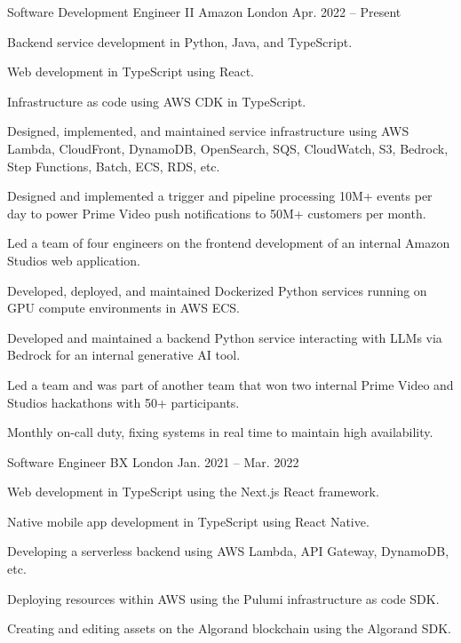 \vspace{-1.1em}


\vspace{-0.2em}

\begin{cventries}

  \cventry
    {Software Development Engineer II} %
    {Amazon} %
    {London} %
    {Apr. 2022 -- Present} %
    {
      \begin{cvitems} %
        \item {Backend service development in Python, Java, and TypeScript.}
        \item {Web development in TypeScript using React.}
        \item {Infrastructure as code using AWS CDK in TypeScript.}
        \item {Designed, implemented, and maintained service infrastructure using AWS Lambda, CloudFront, DynamoDB, OpenSearch, SQS, CloudWatch, S3, Bedrock, Step Functions, Batch, ECS, RDS, etc.}
        \item {Designed and implemented a trigger and pipeline processing 10M+ events per day to power Prime Video push notifications to 50M+ customers per month.}
        \item {Led a team of four engineers on the frontend development of an internal Amazon Studios web application.}
        \item {Developed, deployed, and maintained Dockerized Python services running on GPU compute environments in AWS ECS.}
        \item {Developed and maintained a backend Python service interacting with LLMs via Bedrock for an internal generative AI tool.}
        \item {Led a team and was part of another team that won two internal Prime Video and Studios hackathons with 50+ participants.}
        \item {Monthly on-call duty, fixing systems in real time to maintain high availability.}
      \end{cvitems}
    }

  \cventry
    {Software Engineer} %
    {BX} %
    {London} %
    {Jan. 2021 -- Mar. 2022} %
    {
      \begin{cvitems} %
        \item {Web development in TypeScript using the Next.js React framework.}
        \item {Native mobile app development in TypeScript using React Native.}
        \item {Developing a serverless backend using AWS Lambda, API Gateway, DynamoDB, etc.}
        \item {Deploying resources within AWS using the Pulumi infrastructure as code SDK.}
        \item {Creating and editing assets on the Algorand blockchain using the Algorand SDK.}
      \end{cvitems}
    }


\end{cventries}
